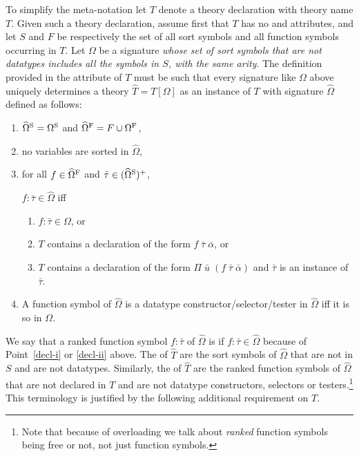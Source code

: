 To simplify the meta-notation let $T$ denote 
a theory declaration with theory name $T$.
Given such a theory declaration,
assume first that $T$ has no  and
 attributes,
and
let $S$ and $F$ be respectively the set of all sort symbols and 
all function symbols occurring in $T$.
Let $\Omega$ be a signature
\emph{whose set of sort symbols that are not datatypes
includes all the symbols in $S$, with the same arity}.
The definition provided in the  attribute of $T$
must be such that
every signature like $\Omega$ above uniquely determines 
a theory $\widehat T = T[\Omega]$ as an instance of $T$
with signature $\widehat\Omega$ defined as follows:
\begin{enumerate}
\item
$\widehat\Omega^\mathrm{S} = \Omega^\mathrm{S}$
and
$\widehat\Omega^\mathrm{F} = F \cup \Omega^\mathrm{F}$,

\item
no variables are sorted in $\widehat\Omega$,

\item
for all $f \in \widehat\Omega^\mathrm{F}$ and 
$\bar{\tau} \in (\widehat\Omega^\mathrm{S})^+$, 

$f{:}\bar{\tau} \in \widehat\Omega$ iff
\begin{enumerate}
\item
$f{:}\bar{\tau} \in \Omega$, or

\item \label{decl-i}
$T$ contains a declaration of the form $f\;\bar{\tau}\;\bar{\alpha}$, or

\item \label{decl-ii}
$T$ contains a declaration of the form $\Pi\;\bar{u}\;(f\;\bar{\tau}\;\bar{\alpha})$ and
$\bar{\tau}$ is an instance of $\bar \tau$.
\end{enumerate}

\item
A function symbol of $\widehat\Omega$ is a datatype constructor/selector/tester 
in $\widehat\Omega$ iff it is so in $\Omega$.
\end{enumerate}

We say that a ranked function symbol $f{:}\bar{\tau}$ of $\widehat\Omega$ 
is  
if $f{:}\bar{\tau} \in \widehat\Omega$
because of Point~\ref{decl-i} or \ref{decl-ii} above.
The  of $\widehat T$ are
the sort symbols of $\widehat\Omega$ that are not in $S$
and are not datatypes.
Similarly, the  of $\widehat T$
are the ranked function symbols of $\widehat\Omega$
that are not declared in $T$
and are not datatype constructors, selectors or testers.\footnote{%
Note that because of overloading 
we talk about \emph{ranked} function symbols being free or not,
not just function symbols.
}
This terminology is justified by the following additional requirement on $T$.

